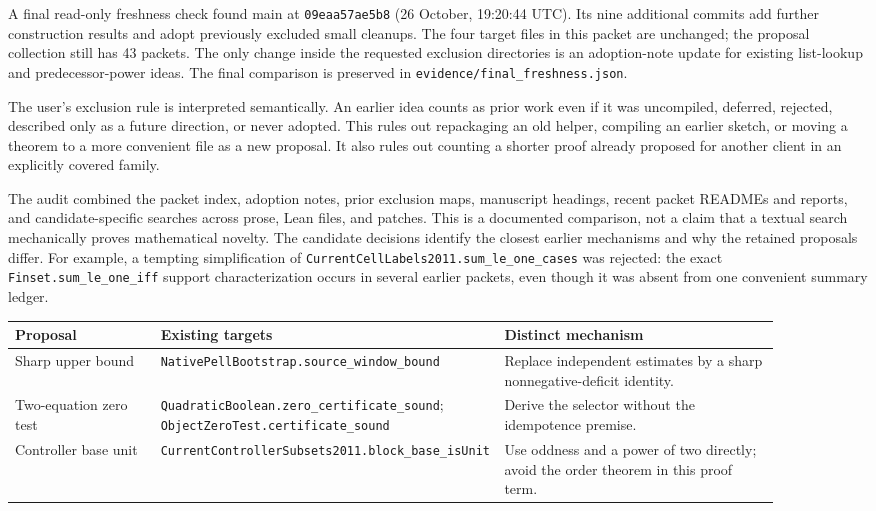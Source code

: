 \documentclass[11pt]{article}
\newcommand{\code}[1]{\nolinkurl{#1}}
\begin{document}
A final read-only freshness check found main at \code{09eaa57ae5b8}
(26 October, 19:20:44 UTC). Its nine additional commits add further
construction results and adopt previously excluded small cleanups. The four
target files in this packet are unchanged; the proposal collection still has
43 packets. The only change inside the requested exclusion directories is an
adoption-note update for existing list-lookup and predecessor-power ideas.
The final comparison is preserved in \code{evidence/final_freshness.json}.

The user's exclusion rule is interpreted semantically. An earlier idea counts
as prior work even if it was uncompiled, deferred, rejected, described only as a
future direction, or never adopted. This rules out repackaging an old helper,
compiling an earlier sketch, or moving a theorem to a more convenient file as a
new proposal. It also rules out counting a shorter proof already proposed for
another client in an explicitly covered family.

The audit combined the packet index, adoption notes, prior exclusion maps,
manuscript headings, recent packet READMEs and reports, and candidate-specific
searches across prose, Lean files, and patches. This is a documented comparison,
not a claim that a textual search mechanically proves mathematical novelty.
The candidate decisions identify the closest earlier mechanisms and why the
retained proposals differ. For example, a tempting simplification of
\code{CurrentCellLabels2011.sum_le_one_cases} was rejected: the exact
\code{Finset.sum_le_one_iff} support characterization occurs in several earlier packets, even
though it was absent from one convenient summary ledger.

\begin{center}
\small
\begin{tabular}{>{\raggedright\arraybackslash}p{0.19\linewidth}>{\raggedright\arraybackslash}p{0.34\linewidth}>{\raggedright\arraybackslash}p{0.36\linewidth}}
\toprule
Proposal & Existing targets & Distinct mechanism \\
\midrule
Sharp upper bound & \code{NativePellBootstrap.source_window_bound} & Replace independent estimates by a sharp nonnegative-deficit identity. \\
Two-equation zero test & \code{QuadraticBoolean.zero_certificate_sound}; \code{ObjectZeroTest.certificate_sound} & Derive the selector without the idempotence premise. \\
Controller base unit & \code{CurrentControllerSubsets2011.block_base_isUnit} & Use oddness and a power of two directly; avoid the order theorem in this proof term. \\
\bottomrule
\end{tabular}
\end{center}
\end{document}
